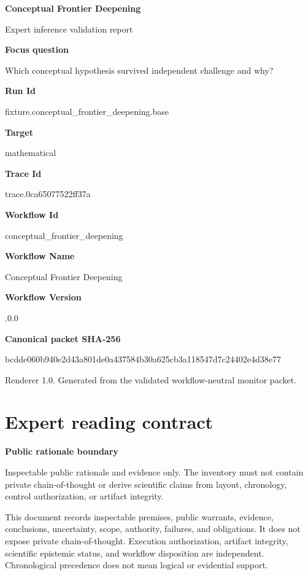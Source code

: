 \documentclass[10pt,a4paper]{article}
\newcommand{\TraceField}[2]{\par\noindent\textbf{#1}\par\noindent #2\par\smallskip}
\begin{document}
\hypersetup{pageanchor=false}
\begin{titlepage}
\centering
{\LARGE\bfseries Conceptual\allowbreak{} Frontier Deepening\par}
\vspace{1em}
{\large Expert inference validation report\par}
\vspace{2em}
\begin{minipage}{0.92\linewidth}
\TraceField{Focus question}{Which conceptual\allowbreak{} hypothesis\allowbreak{} survived independen\allowbreak{}t challenge and why?}

\TraceField{Run Id}{fixture.\allowbreak{}conceptual\allowbreak{}\_\allowbreak{}frontier\_\allowbreak{}deepening.\allowbreak{}base}

\TraceField{Target}{mathematic\allowbreak{}al}

\TraceField{Trace Id}{trace.\allowbreak{}0ca6507752\allowbreak{}2ff37a}

\TraceField{Workflow Id}{conceptual\allowbreak{}\_\allowbreak{}frontier\_\allowbreak{}deepening}

\TraceField{Workflow Name}{Conceptual\allowbreak{} Frontier Deepening}

\TraceField{Workflow Version}{1.\allowbreak{}0.\allowbreak{}0}

\TraceField{Canonical packet SHA-256}{bcdde060b9\allowbreak{}40e2d43a80\allowbreak{}1de0a43758\allowbreak{}4b30a625cb\allowbreak{}3a118547d7\allowbreak{}c24402e4d3\allowbreak{}8e77}

\end{minipage}
\vfill
{\small Renderer 1.0. Generated from the validated workflow-neutral monitor packet.}
\end{titlepage}
\tableofcontents\clearpage
\hypersetup{pageanchor=true}
\section{Expert reading contract}\label{sec-reading-contract}
\TraceField{Public rationale boundary}{Inspectabl\allowbreak{}e public rationale and evidence only.\allowbreak{} The inventory must not contain private chain-\allowbreak{}of-\allowbreak{}thought or derive scientific\allowbreak{} claims from layout, chronology\allowbreak{}, control authorizat\allowbreak{}ion, or artifact integrity.\allowbreak{}}

This document records inspectable premises, public warrants, evidence, conclusions,
uncertainty, scope, authority, failures, and obligations. It does not expose private
chain-of-thought. Execution authorization, artifact integrity, scientific epistemic
status, and workflow disposition are independent. Chronological precedence does not
mean logical or evidential support.
\end{document}
